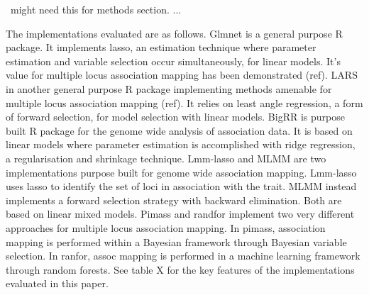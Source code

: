 \ might need this for methods section. ...

The implementations evaluated are as follows. Glmnet is a general purpose R package. It implements lasso, an estimation technique where parameter estimation and variable selection occur simultaneously, for linear models. It's value for multiple locus association mapping has been demonstrated (ref). LARS in another general purpose R package implementing methods amenable for  multiple locus association mapping (ref). It relies on least angle regression, a form of forward selection, for model selection with linear models. BigRR is purpose built R package for the genome wide analysis of association data. It is based on linear models where parameter estimation is accomplished with ridge regression, a regularisation and shrinkage technique. Lmm-lasso and MLMM are two implementations purpose built for genome wide association mapping. Lmm-lasso uses lasso to identify the set of loci in association with the trait. MLMM instead implements a forward selection strategy with backward elimination. Both are based on linear mixed models. Pimass and randfor implement two very different approaches for multiple locus association mapping. In pimass, association mapping is performed within a Bayesian framework through Bayesian variable selection.  In ranfor, assoc mapping is performed in a machine learning framework through random forests. See table X for the  key features of the implementations evaluated in this paper.

